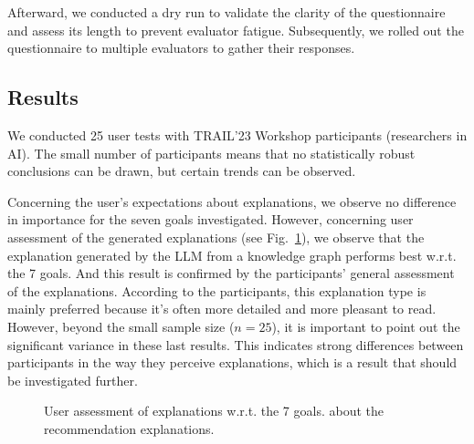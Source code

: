Afterward, we conducted a dry run to validate the clarity of the questionnaire and assess its length to prevent evaluator fatigue. Subsequently, we rolled out the questionnaire to multiple evaluators to gather their responses.

\subsection{Results}

We conducted 25 user tests with TRAIL'23 Workshop participants (researchers in AI). The small number of participants means that no statistically robust conclusions can be drawn, but certain trends can be observed.

%     

Concerning the user's expectations about explanations, we observe no difference in importance for the seven goals investigated. However, concerning user assessment of the generated explanations (see Fig.~\ref{fig:ResultsExplanation}), we observe that the explanation generated by the LLM from a knowledge graph performs best w.r.t. the 7 goals. And this result is confirmed by the participants' general assessment of the explanations. According to the participants, this explanation type is mainly preferred because it's often more detailed and more pleasant to read.
However, beyond the small sample size ($n = 25$), it is important to point out the significant variance in these last results. This indicates strong differences between participants in the way they perceive explanations, which is a result that should be investigated further.

\begin{figure}[!ht]
    \centering
    
    \caption{User assessment of explanations w.r.t. the 7 goals. about the recommendation explanations.}
    \label{fig:ResultsExplanation}
\end{figure}


